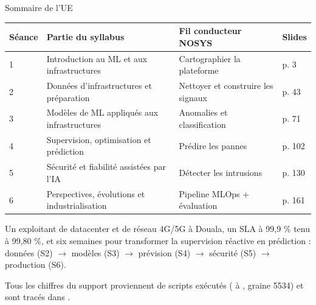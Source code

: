 \begin{frame}{Sommaire de l'UE}
\begin{center}
\small
\begin{tabular}{@{}llll@{}}
\toprule
\textbf{Séance} & \textbf{Partie du syllabus} & \textbf{Fil conducteur NOSYS} & \textbf{Slides}\\
\midrule
1 & Introduction au ML et aux infrastructures & Cartographier la plateforme & p. 3\\
2 & Données d'infrastructures et préparation & Nettoyer et construire les signaux & p. 43\\
3 & Modèles de ML appliqués aux infrastructures & Anomalies et classification & p. 71\\
4 & Supervision, optimisation et prédiction & Prédire les pannes & p. 102\\
5 & Sécurité et fiabilité assistées par l'IA & Détecter les intrusions & p. 130\\
6 & Perspectives, évolutions et industrialisation & Pipeline MLOps + évaluation & p. 161\\
\bottomrule
\end{tabular}
\end{center}
\begin{ebox}
Un exploitant de datacenter et de réseau 4G/5G à Douala, un SLA à 99,9 \% tenu à
99,80 \%, et six semaines pour transformer la supervision réactive en prédiction :
données (S2) $\to$ modèles (S3) $\to$ prévision (S4) $\to$ sécurité (S5) $\to$
production (S6).
\end{ebox}
\begin{center}\small
Tous les chiffres du support proviennent de scripts exécutés
( à , graine 5534) et sont tracés
dans .
\end{center}
\end{frame}








